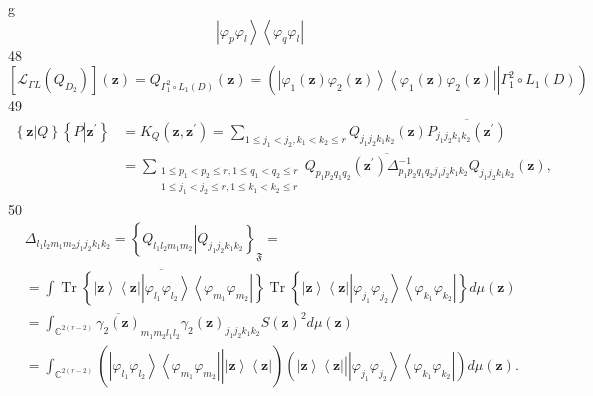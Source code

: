 \documentclass[aps,preprint]{revtex4}%
\begin{document}
g%
\[
\left\vert \varphi_{p}\varphi_{l}\right\rangle \left\langle \varphi_{q}%
\varphi_{l}\right\vert
\]
48%
\[
\left[  \mathcal{L}_{\Gamma L}\left(  Q_{D_{2}}\right)  \right]  \left(
\mathbf{z}\right)  =Q_{\Gamma_{1}^{2}\circ L_{1}\left(  D\right)  }\left(
\mathbf{z}\right)  =\left(  \left.  \overset{}{\left\vert \varphi_{1}\left(
\mathbf{z}\right)  \varphi_{2}\left(  \mathbf{z}\right)  \right\rangle
\left\langle \varphi_{1}\left(  \mathbf{z}\right)  \varphi_{2}\left(
\mathbf{z}\right)  \right\vert }\right\vert \Gamma_{1}^{2}\circ L_{1}\left(
D\right)  \right)
\]
49%
\begin{align*}
\left\{  \mathbf{z}\left\vert Q\right.  \right\}  \left\{  P\left\vert
\mathbf{z}^{\prime}\right.  \right\}   &  =K_{Q}\left(  \mathbf{z,z}^{\prime
}\right)  =\sum_{1\leq j_{1}<j_{2},k_{1}<k_{2}\leq r}Q_{j_{1}j_{2}k_{1}k_{2}%
}\left(  \mathbf{z}\right)  \overline{P_{j_{1}j_{2}k_{1}k_{2}}\left(
\mathbf{z}^{\prime}\right)  }\\
&  =\sum_{\substack{1\leq p_{1}<p_{2}\leq r,1\leq q_{1}<q_{2}\leq r\\1\leq
j_{1}<j_{2}\leq r,1\leq k_{1}<k_{2}\leq r}}\overline{Q_{p_{1}p_{2}q_{1}q_{2}%
}\left(  \mathbf{z}^{\prime}\right)  \Delta_{p_{1}p_{2}q_{1}q_{2}j_{1}%
j_{2}k_{1}k_{2}}^{-1}}Q_{j_{1}j_{2}k_{1}k_{2}}\left(  \mathbf{z}\right)  ,
\end{align*}
50%
\begin{align*}
&  \Delta_{l_{1}l_{2}m_{1}m_{2}j_{1}j_{2}k_{1}k_{2}}=\left\{  Q_{l_{1}%
l_{2}m_{1}m_{2}}\left\vert Q_{j_{1}j_{2}k_{1}k_{2}}\right.  \right\}
_{\mathfrak{F}}=\\
&  =\int\overline{\operatorname*{Tr}\left\{  \left\vert \mathbf{z}%
\right\rangle \left\langle \mathbf{z}\right\vert \left\vert \varphi_{l_{1}%
}\varphi_{l_{2}}\right\rangle \left\langle \varphi_{m_{1}}\varphi_{m_{2}%
}\right\vert \right\}  }\operatorname*{Tr}\left\{  \left\vert \mathbf{z}%
\right\rangle \left\langle \mathbf{z}\right\vert \left\vert \varphi_{j_{1}%
}\varphi_{j_{2}}\right\rangle \left\langle \varphi_{k_{1}}\varphi_{k_{2}%
}\right\vert \right\}  d\mu\left(  \mathbf{z}\right)  \\
&  =\int_{\mathbb{C}^{2\left(  r-2\right)  }}\overline{\gamma_{2}\left(
\mathbf{z}\right)  }_{m_{1}m_{2}l_{1}l_{2}}\gamma_{2}\left(  \mathbf{z}%
\right)  _{j_{1}j_{2}k_{1}k_{2}}S\left(  \mathbf{z}\right)  ^{2}d\mu\left(
\mathbf{z}\right)  \\
&  =\int_{\mathbb{C}^{2\left(  r-2\right)  }}\left(  \left.
\overset{}{\left\vert \varphi_{l_{1}}\varphi_{l_{2}}\right\rangle \left\langle
\varphi_{m_{1}}\varphi_{m_{2}}\right\vert }\right\vert \left\vert
\mathbf{z}\right\rangle \left\langle \mathbf{z}\right\vert \right)  \left(
\left.  \overset{}{\left\vert \mathbf{z}\right\rangle \left\langle
\mathbf{z}\right\vert }\right\vert \left\vert \varphi_{j_{1}}\varphi_{j_{2}%
}\right\rangle \left\langle \varphi_{k_{1}}\varphi_{k_{2}}\right\vert \right)
d\mu\left(  \mathbf{z}\right)  .
\end{align*}
\end{document}
